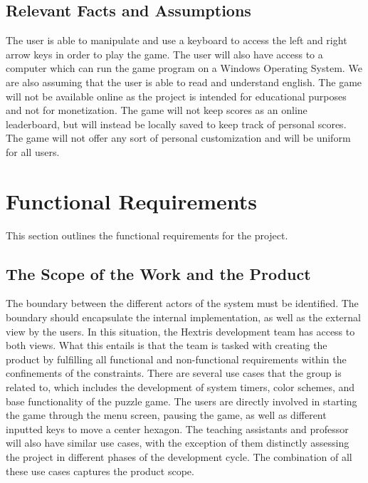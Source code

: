 \documentclass[12pt, titlepage]{article}
\begin{document}
\subsection{Relevant Facts and Assumptions}

The user is able to manipulate and use a keyboard to access the left and right arrow keys in order to play the game. The user will also have access to a computer which can run the game program on a Windows Operating System. We are also assuming that the user is able to read and understand english. The game will not be available online as the project is intended for educational purposes and not for monetization. The game will not keep scores as an online leaderboard, but will instead be locally saved to keep track of personal scores. The game will not offer any sort of personal customization and will be uniform for all users.

\newpage
\section{Functional Requirements}
This section outlines the functional requirements for the project.

\subsection{The Scope of the Work and the Product}
The boundary between the different actors of the system must be identified. The boundary should encapsulate the internal implementation, as well as the external view by the users. In this situation, the Hextris development team has access to both views. What this entails is that the team is tasked with creating the product by fulfilling all functional and non-functional requirements within the confinements of the constraints. There are several use cases that the group is related to, which includes the development of system timers, color schemes, and base functionality of the puzzle game. The users are directly involved in starting the game through the menu screen, pausing the game, as well as different inputted keys to move a center hexagon. The teaching assistants and professor will also have similar use cases, with the exception of them distinctly assessing the project in different phases of the development cycle. The combination of all these use cases captures the product scope. 
\end{document}
